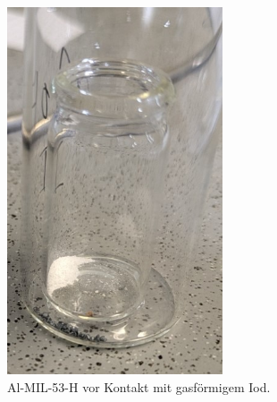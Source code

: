 \documentclass[12pt, a4paper]{article}
\begin{document}
\begin{figure}[h!]
    \centering
    \begin{subfigure}[b]{0.45\textwidth}
        \centering
        \includegraphics[width=0.7\textwidth]{MOF25Ivor.jpg}
        \caption{Al-MIL-53-H vor Kontakt mit gasförmigem Iod.}
        \label{VergleichMOF25Ivor}
    \end{subfigure}
    \hfill
    \begin{subfigure}[b]{0.45\textwidth}
        \centering

\end{subfigure}
\end{figure}
\end{document}
